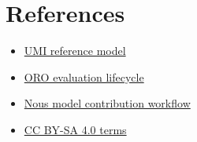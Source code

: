 \section*{References}\label{references}

\begin{itemize}
\tightlist
\item
  \href{https://github.com/Umi-BitSign/umi-reference-model}{UMI reference model}
\item
  \href{https://docs.oroagents.com/docs/miners/evaluation-lifecycle}{ORO evaluation lifecycle}
\item
  \href{https://github.com/NousResearch/finetuning-subnet/blob/master/docs/miner.md}{Nous model contribution workflow}
\item
  \href{https://creativecommons.org/licenses/by-sa/4.0/}{CC BY-SA 4.0 terms}
\end{itemize}
